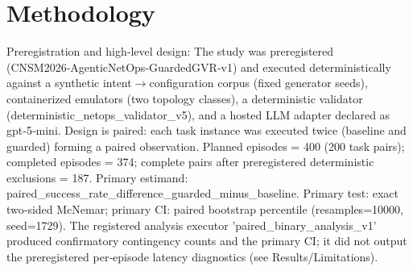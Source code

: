\documentclass[conference]{IEEEtran}
\begin{document}
\section{Methodology}
Preregistration and high‑level design: The study was preregistered (CNSM2026‑AgenticNetOps‑GuardedGVR‑v1) and executed deterministically against a synthetic intent\ensuremath{\rightarrow}configuration corpus (fixed generator seeds), containerized emulators (two topology classes), a deterministic validator (deterministic\_netops\_validator\_v5), and a hosted LLM adapter declared as gpt‑5‑mini. Design is paired: each task instance was executed twice (baseline and guarded) forming a paired observation. Planned episodes = 400 (200 task pairs); completed episodes = 374; complete pairs after preregistered deterministic exclusions = 187. Primary estimand: paired\_success\_rate\_difference\_guarded\_minus\_baseline. Primary test: exact two‑sided McNemar; primary CI: paired bootstrap percentile (resamples=10000, seed=1729). The registered analysis executor 'paired\_binary\_analysis\_v1' produced confirmatory contingency counts and the primary CI; it did not output the preregistered per‑episode latency diagnostics (see Results/Limitations).
\end{document}
